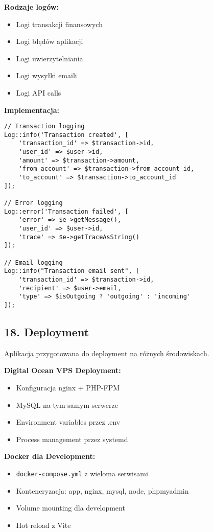 \textbf{Rodzaje logów:}
\begin{itemize}
    \item Logi transakcji finansowych
    \item Logi błędów aplikacji
    \item Logi uwierzytelniania
    \item Logi wysyłki emaili
    \item Logi API calls
\end{itemize}

\textbf{Implementacja:}
\begin{verbatim}
// Transaction logging
Log::info('Transaction created', [
    'transaction_id' => $transaction->id,
    'user_id' => $user->id,
    'amount' => $transaction->amount,
    'from_account' => $transaction->from_account_id,
    'to_account' => $transaction->to_account_id
]);

// Error logging
Log::error('Transaction failed', [
    'error' => $e->getMessage(),
    'user_id' => $user->id,
    'trace' => $e->getTraceAsString()
]);

// Email logging
Log::info("Transaction email sent", [
    'transaction_id' => $transaction->id,
    'recipient' => $user->email,
    'type' => $isOutgoing ? 'outgoing' : 'incoming'
]);
\end{verbatim}

\subsection{18. Deployment}

Aplikacja przygotowana do deployment na różnych środowiskach.

\textbf{Digital Ocean VPS Deployment:}
\begin{itemize}
    \item Konfiguracja nginx + PHP-FPM
    \item MySQL na tym samym serwerze
    \item Environment variables przez .env
    \item Process management przez systemd
\end{itemize}

\textbf{Docker dla Development:}
\begin{itemize}
    \item \texttt{docker-compose.yml} z wieloma serwisami
    \item Konteneryzacja: app, nginx, mysql, node, phpmyadmin
    \item Volume mounting dla development
    \item Hot reload z Vite
\end{itemize}

